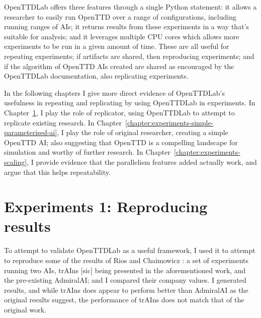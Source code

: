\documentclass[logo,msc,dsti]{style/infthesis}    %
\begin{document}
{OpenTTDLab offers three features through a single Python statement: it allows a researcher to easily run OpenTTD over a range of configurations, including running ranges of AIs; it returns results from these experiments in a way that's suitable for analysis; and it leverages multiple CPU cores which allows more experiments to be run in a given amount of time. These are all useful for repeating experiments; if artifacts are shared, then reproducing experiments; and if the algorithm of OpenTTD AIs created are shared as encouraged by the OpenTTDLab documentation, also replicating experiments.

In the following chapters I give more direct evidence of OpenTTDLab's usefulness in repeating and replicating by using OpenTTDLab in experiments. In Chapter~\ref{chapter:experiments-attempt-at-reproducing}, I play the role of replicator, using OpenTTDLab to attempt to replicate existing research. In Chapter~\ref{chapter:experiments-simple-parameterised-ai}, I play the role of original researcher, creating a simple OpenTTD AI; also suggesting that OpenTTD is a compelling landscape for simulation and worthy of further research. In Chapter~\ref{chapter:experiments-scaling}, I provide evidence that the parallelism features added actually work, and argue that this helps repeatability.



\chapter{Experiments 1: Reproducing results}
\label{chapter:experiments-attempt-at-reproducing}

To attempt to validate OpenTTDLab as a useful framework, I used it to attempt to reproduce some of the results of Rios and Chaimowicz \cite{rios2009trains}: a set of experiments running two AIs, trAIns [sic] being presented in the aforementioned work, and the pre-existing AdmiralAI; and I compared their company values. I generated results, and while trAIns does appear to perform better than AdmiralAI as the original results suggest, the performance of trAIns does not match that of the original work.

}
\end{document}
